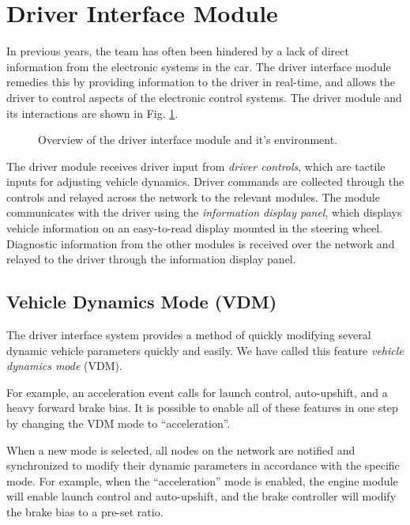 \section{Driver Interface Module\label{sec:Driver-Interface-Module}}

In previous years, the team has often been hindered by a lack of direct information from the electronic systems in the car. The driver interface module remedies this by providing information to the driver in real-time, and allows the driver to control aspects of the electronic control systems. The driver module and its interactions are shown in Fig. \ref{fig:design_interface_overview_block}.

\begin{figure}[H]
	\centering
	
	\caption{Overview of the driver interface module and it's environment.}
	\label{fig:design_interface_overview_block}
\end{figure}

The driver module receives driver input from \emph{driver controls}, which are tactile inputs for adjusting vehicle dynamics. Driver commands are collected through the controls and relayed across the network to the relevant modules. The module communicates with the driver using the \emph{information display panel}, which displays vehicle information on an easy-to-read display mounted in the steering wheel. Diagnostic information from the other modules is received over the network and relayed to the driver through the information display panel. 

\subsection{Vehicle Dynamics Mode (VDM)}

The driver interface system provides a method of quickly modifying several dynamic vehicle parameters quickly and easily. We have called this feature \emph{vehicle dynamics mode} (VDM). 

For example, an acceleration event calls for launch control, auto-upshift, and a heavy forward brake bias. It is possible to enable all of these features in one step by changing the VDM mode to {}``acceleration''. 

When a new mode is selected, all nodes on the network are notified and synchronized to modify their dynamic parameters in accordance with the specific mode. For example, when the  {}``acceleration'' mode is enabled, the engine module will enable launch control and auto-upshift, and the brake controller will modify the brake bias to a pre-set ratio.

